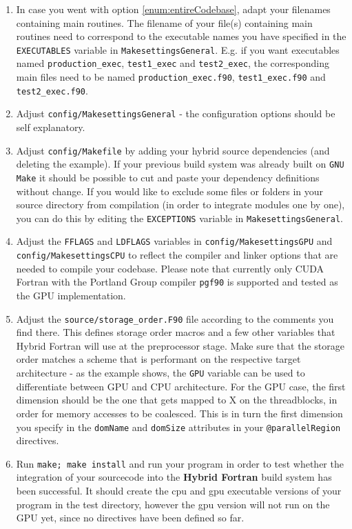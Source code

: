 \begin{enumerate}
\begin{enumerate}
   \end{enumerate}
 \item In case you went with option \ref{enum:entireCodebase}, adapt your filenames containing main routines. The filename of your file(s) containing main routines need to correspond to the executable names you have specified in the \verb|EXECUTABLES| variable in \verb|MakesettingsGeneral|. E.g. if you want executables named \verb|production_exec|, \verb|test1_exec| and \verb|test2_exec|, the corresponding main files need to be named \verb|production_exec.f90|, \verb|test1_exec.f90| and \verb|test2_exec.f90|.
 \item Adjust \verb|config/MakesettingsGeneral| - the configuration options should be self explanatory.
 \item Adjust \verb|config/Makefile| by adding your hybrid source dependencies (and deleting the example). If your previous build system was already built on \verb|GNU Make| it should be possible to cut and paste your dependency definitions without change. If you would like to exclude some files or folders in your source directory from compilation (in order to integrate modules one by one), you can do this by editing the \verb|EXCEPTIONS| variable in \verb|MakesettingsGeneral|.
 \item Adjust the \verb|FFLAGS| and \verb|LDFLAGS| variables in \verb|config/MakesettingsGPU| and \verb|config/MakesettingsCPU| to reflect the compiler and linker options that are needed to compile your codebase. Please note that currently only CUDA Fortran with the Portland Group compiler \verb|pgf90| is supported and tested as the GPU implementation.
 \item Adjust the \verb|source/storage_order.F90| file according to the comments you find there. This defines storage order macros and a few other variables that Hybrid Fortran will use at the preprocessor stage. Make sure that the storage order matches a scheme that is performant on the respective target architecture - as the example shows, the \verb|GPU| variable can be used to differentiate between GPU and CPU architecture. For the GPU case, the first dimension should be the one that gets mapped to X on the threadblocks, in order for memory accesses to be coalesced. This is in turn the first dimension you specify in the \verb|domName| and \verb|domSize| attributes in your \verb|@parallelRegion| directives.
 \item Run \verb|make; make install| and run your program in order to test whether the integration of your sourcecode into the \textbf{Hybrid Fortran} build system has been successful. It should create the cpu and gpu executable versions of your program in the test directory, however the gpu version will not run on the GPU yet, since no directives have been defined so far.

\end{enumerate}
